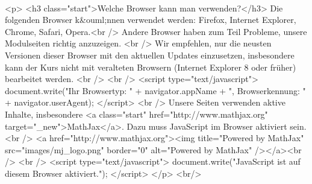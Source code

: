 \begin{MSectionStart}
\ \\
\begin{html}
<p>
<h3  class="start">Welche Browser kann man verwenden?</h3>
Die folgenden Browser k&ouml;nnen verwendet werden: Firefox, Internet Explorer, Chrome, Safari, Opera.<br />
Andere Browser haben zum Teil Probleme, unsere Modulseiten richtig anzuzeigen.
<br />
Wir empfehlen, nur die neusten Versionen dieser Browser mit den aktuellen Updates einzusetzen,
insbesondere kann der Kurs nicht mit veralteten Browsern (Internet Explorer 8 oder früher) bearbeitet werden.
<br />
<br />
<script type="text/javascript">
document.write("Ihr Browsertyp: " + navigator.appName + ", Browserkennung: " + navigator.userAgent);
</script>
<br />
Unsere Seiten verwenden aktive Inhalte, insbesondere <a class="start" href="http://www.mathjax.org" target="_new">MathJax</a>. Dazu muss JavaScript im Browser aktiviert sein.
<br />
<a href="http://www.mathjax.org"><img title="Powered by MathJax" src="images/mj_logo.png" border="0" alt="Powered by MathJax" /></a><br />
<br />
<script type="text/javascript">
document.write("JavaScript ist auf diesem Browser aktiviert.");
</script>
</p>
<br/>
\end{html}

\end{MSectionStart}


